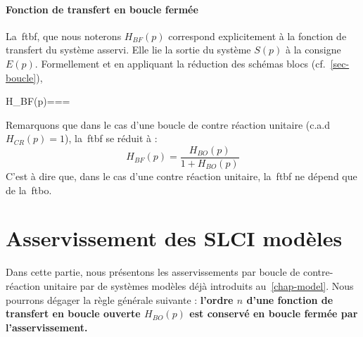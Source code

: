 \paragraph{Fonction de transfert en boucle fermée}
La~\gls{ftbf}, que nous noterons $H_{BF}(p)$ correspond
explicitement à la fonction de transfert du système asservi. 
Elle lie la sortie du système $S(p)$ à la consigne $E(p)$. Formellement et en 
appliquant la réduction des schémas blocs (cf.~\cref{sec-boucle}),
\begin{bequation}
    H_{BF}(p)===
\end{bequation}
Remarquons que dans le cas d'une boucle de contre réaction unitaire 
(c.a.d $H_{CR}(p)=1$), la~\gls{ftbf} se réduit à :
\[
H_{BF}(p)=\dfrac{H_{BO}(p)}{1+H_{BO}(p)}
\]
C'est à dire que, dans le cas d'une contre réaction unitaire, la~\gls{ftbf} 
ne dépend que de la~\gls{ftbo}.
\section{Asservissement des SLCI modèles}
Dans cette partie, nous présentons les asservissements par boucle 
de contre-réaction unitaire par de systèmes modèles déjà introduits 
au~\cref{chap-model}. Nous pourrons dégager la règle générale suivante :
\textbf{l'ordre $n$ d'une fonction de transfert en boucle ouverte $H_{BO}(p)$
est conservé en boucle fermée par l'asservissement.}
